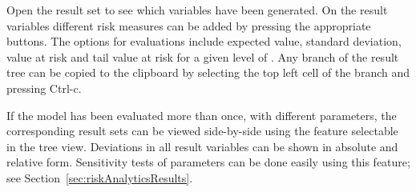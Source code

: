 Open the result set to see which variables have been generated. On the result variables different risk measures can be added by pressing the appropriate buttons. The options for evaluations include expected value, standard deviation, value at risk and tail value at risk for a given level of . Any branch of the result tree can be copied to the clipboard by selecting the top left cell of the branch and pressing Ctrl-c.

If the model has been evaluated more than once, with different parameters, the corresponding result sets can be viewed side-by-side using the  feature 
selectable in the tree view. Deviations in all result variables can be shown in absolute and relative form. Sensitivity tests of parameters can be done easily using this feature; see Section~\ref{sec:riskAnalyticsResults}.


